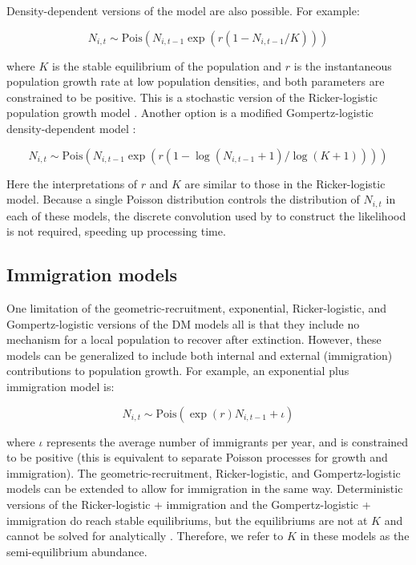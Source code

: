 \documentclass[12pt,english]{article}
\begin{document}
\begin{spacing}{1.9}
\begin{flushleft}
\begin{samepage}
Density-dependent versions of the model are also possible.  For
example:
\begin{linenomath*}
\begin{equation}
  N_{i,t} \sim \mathrm{Pois}(N_{i,t-1}\exp(r(1-N_{i,t-1}/K)))
\label{eq:rick}
\end{equation}
\end{linenomath*}
where $K$ is the stable equilibrium of the population and $r$ is
the instantaneous population growth rate at low population
densities, and both parameters are constrained to be positive. This is
a stochastic version of the Ricker-logistic population growth model
\citep{ricker:1954}. Another option is a modified Gompertz-logistic
density-dependent model \citep{hart_gotelli:2011}:
\begin{linenomath*}
\begin{equation}
N_{i,t} \sim \mathrm{Pois}(N_{i,t-1}\exp(r(1-\log(N_{i,t-1}+1)/\log(K+1))))
\label{eq:gomp}
\end{equation}
\end{linenomath*}
Here the interpretations of $r$ and $K$ are similar to those in the
Ricker-logistic model. Because a single Poisson distribution controls
the distribution of $N_{i,t}$ in each of these models, the discrete 
convolution used by \citet{dail_madsen:2011} to construct the
likelihood is not required, speeding up processing time.
\end{samepage}


\subsection*{Immigration models}

One limitation of the geometric-recruitment, exponential,
Ricker-logistic, and Gompertz-logistic versions of the DM models all
is that they include no mechanism for a local population to recover
after extinction. 
However, these models can be generalized 
to include both internal and external (immigration) contributions
to population growth. For example, an exponential plus immigration
model is:
\begin{linenomath*}
\begin{equation}
  N_{i,t} \sim \mathrm{Pois}(\exp(r)N_{i,t-1} + \iota)
  \label{eq:expimm2}
\end{equation}
\end{linenomath*}
where $\iota$ represents the average number of immigrants per year, and is
constrained to be
positive (this is equivalent to separate Poisson processes for
growth and immigration).  
The geometric-recruitment, Ricker-logistic,
and Gompertz-logistic models can be extended to allow for immigration in the
same way.   Deterministic versions of the Ricker-logistic + immigration and the 
Gompertz-logistic + immigration do reach stable equilibriums, but the equilibriums 
are not at $K$ and cannot be solved for analytically \citep{otto_day:2007}.  Therefore, we
refer to $K$ in these models as the semi-equilibrium abundance.


\end{flushleft}
\end{spacing}
\end{document}
